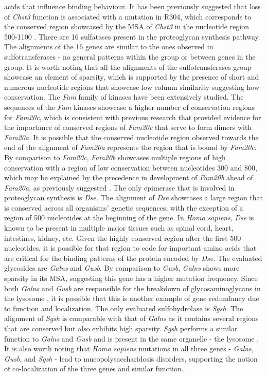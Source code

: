 \documentclass{article}
\begin{document}
acids that influence binding behaviour. It has been previously suggested that loss of \textit{Chst3} function is associated with a mutation in R304, which corresponds to the conserved region showcased by the MSA of \textit{Chst3} in the nucleotide region 500-1100 \cite{chst}. There are 16 sulfatases present in the proteoglycan synthesis pathway. The alignments of the 16 genes are similar to the ones observed in sulfotransferases - no general patterns within the group or between genes in the group. It is worth noting that all the alignments of the sulfotransferases group showcase an element of sparsity, which is supported by the presence of short and numerous nucleotide regions that showcase low column similarity suggesting how conservation. The \textit{Fam} family of kinases have been extensively studied. The sequences of the \textit{Fam} kinases showcase a higher number of conservation regions for \textit{Fam20c}, which is consistent with previous research that provided evidence for the importance of conserved regions of \textit{Fam20c} that serve to form dimers with \textit{Fam20a}\cite{fam20}. It is possible that the conserved nucleotide region observed towards the end of the alignment of \textit{Fam20a} represents the region that is bound by \textit{Fam20c}. By comparison to \textit{Fam20c}, \textit{Fam20b} showcases multiple regions of high conservation with a region of low conservation between nucleotides 300 and 800, which may be explained by the precedence in development of \textit{Fam20b} ahead of \textit{Fam20a}, as previously suggested \cite{fam20}. The only epimerase that is involved in proteoglycan synthesis is \textit{Dse}. The alignment of \textit{Dse} showcases a large region that is conserved across all organisms' genetic sequences, with the exception of a region of 500 nucleotides at the beginning of the gene. In \textit{Homo sapiens}, \textit{Dse} is known to be present in multiple major tissues such as spinal cord, heart, intestines, kidney, etc. Given the highly conserved region after the first 500 nucleotides, it is possible for that region to code for important amino acids that are critical for the binding patterns of the protein encoded by \textit{Dse}. The evaluated glycosides are \textit{Galns} and \textit{Gusb}. By comparison to \textit{Gusb}, \textit{Galns} shows more sparsity in its MSA, suggesting this gene has a higher mutation frequency. Since both \textit{Galns} and \textit{Gusb} are responsible for the breakdown of glycosaminoglycans in the lysosome \cite{galns, gusb}, it is possible that this is another example of gene redundancy due to function and localization. The only evaluated sulfohydrolase is \textit{Sgsh}. The alignment of \textit{Sgsh} is comparable with that of \textit{Galns} as it contains several regions that are conserved but also exhibits high sparsity. \textit{Sgsh} performs a similar function to \textit{Galns} and \textit{Gusb} and is present in the same organelle - the lysosome \cite{sgsh}. It is also worth noting that \textit{Homo sapiens} mutations in all three genes - \textit{Galns, Gusb}, and \textit{Sgsh} - lead to mucopolysaccharidosis disorders, supporting the notion of co-localization of the three genes and similar function.
\end{document}
